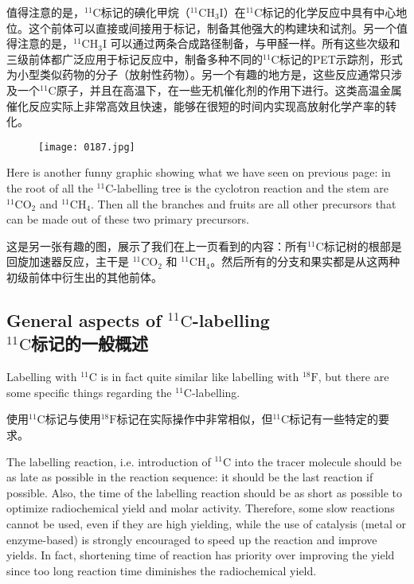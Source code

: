 \documentclass[dvipsnames, svgnames,a4paper,11pt]{article}
\begin{document}
值得注意的是，${}^\mathrm{11}\mathrm{C}$标记的碘化甲烷（$\mathrm{^{11}CH_3I}$）在${}^\mathrm{11}\mathrm{C}$标记的化学反应中具有中心地位。这个前体可以直接或间接用于标记，制备其他强大的构建块和试剂。另一个值得注意的是，$\mathrm{^{11}CH_3I}$ 可以通过两条合成路径制备，与甲醛一样。所有这些次级和三级前体都广泛应用于标记反应中，制备多种不同的${}^\mathrm{11}\mathrm{C}$标记的PET示踪剂，形式为小型类似药物的分子（放射性药物）。另一个有趣的地方是，这些反应通常只涉及一个${}^\mathrm{11}\mathrm{C}$原子，并且在高温下，在一些无机催化剂的作用下进行。这类高温金属催化反应实际上非常高效且快速，能够在很短的时间内实现高放射化学产率的转化。

\begin{figure}[h]
	\centering
    \texttt{[image: 0187.jpg]}  
     \label{fig217}
\end{figure}

Here is another funny graphic showing what we have seen on previous page: in the root of all the ${}^\mathrm{11}\mathrm{C}$-labelling tree is the cyclotron reaction and the stem are ${}^\mathrm{11}\mathrm{CO_2}$ and ${}^\mathrm{11}\mathrm{CH_4}$. Then all the branches and fruits are all other precursors that can be made out of these two primary precursors.

这是另一张有趣的图，展示了我们在上一页看到的内容：所有${}^\mathrm{11}\mathrm{C}$标记树的根部是回旋加速器反应，主干是 $\mathrm{^{11}CO_2}$ 和 $\mathrm{^{11}CH_4}$。然后所有的分支和果实都是从这两种初级前体中衍生出的其他前体。



\subsection{General aspects of ${}^\mathrm{11}\mathrm{C}$-labelling \\${}^\mathrm{11}\mathrm{C}$标记的一般概述}

Labelling with ${}^\mathrm{11}\mathrm{C}$ is in fact quite similar like labelling with ${}^\mathrm{18}\mathrm{F}$, but there are some specific things regarding the ${}^\mathrm{11}\mathrm{C}$-labelling.

使用${}^\mathrm{11}\mathrm{C}$标记与使用${}^\mathrm{18}\mathrm{F}$标记在实际操作中非常相似，但${}^\mathrm{11}\mathrm{C}$标记有一些特定的要求。

The labelling reaction, i.e. introduction of ${}^\mathrm{11}\mathrm{C}$ into the tracer molecule should be as late as possible in the reaction sequence: it should be the last reaction if possible. Also, the time of the labelling reaction should be as short as possible to optimize radiochemical yield and molar activity. Therefore, some slow reactions cannot be used, even if they are high yielding, while the use of catalysis (metal or enzyme-based) is strongly encouraged to speed up the reaction and improve yields. In fact, shortening time of reaction has priority over improving the yield since too long reaction time diminishes the radiochemical yield.
\end{document}
